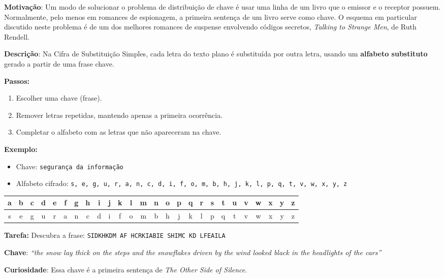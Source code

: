 \textbf{Motivação}:
Um modo de solucionar o problema de distribuição de chave é usar uma linha de um livro que o emissor e o receptor possuem. Normalmente, pelo menos em romances de espionagem, a primeira sentença de um livro serve como chave. O esquema em particular discutido neste problema é de um dos melhores romances de suspense envolvendo códigos secretos, \textit{Talking to Strange Men}, de Ruth Rendell.

\textbf{Descrição}:
Na Cifra de Substituição Simples, cada letra do texto plano é substituída por outra letra, usando um \textbf{alfabeto substituto} gerado a partir de uma frase chave.

\medskip
\textbf{Passos:}
\begin{enumerate}
    \item Escolher uma chave (frase).
    \item Remover letras repetidas, mantendo apenas a primeira ocorrência.
    \item Completar o alfabeto com as letras que não apareceram na chave.
\end{enumerate}

\medskip
\textbf{Exemplo:}
\begin{itemize}

    \item Chave: \texttt{segurança da informação}
    \item Alfabeto cifrado: \texttt{s, e, g, u, r, a, n, c, d, i, f, o, m, b, h, j, k, l, p, q, t, v, w, x, y, z}
\end{itemize}

\begin{table}[h]
    \centering
    \begin{tabular}{|*{26}{c|}}
        \hline
        a & b & c & d & e & f & g & h & i & j & k & l & m & n & o & p & q & r & s & t & u & v & w & x & y & z \\
        \hline
        s & e & g & u & r & a & n & c & d & i & f & o & m & b & h & j & k & l & p & q & t & v & w & x & y & z \\
        \hline
    \end{tabular}
\end{table}

\medskip
\textbf{Tarefa:}
Descubra a frase: \texttt{SIDKHKDM AF HCRKIABIE SHIMC KD LFEAILA}


\textbf{Chave}: \emph{``the snow lay thick on the steps and the snowflakes driven by the wind looked black in the headlights of the cars''}

\textbf{Curiosidade}: Essa chave é a primeira sentença de \textit{The Other Side of Silence}.

